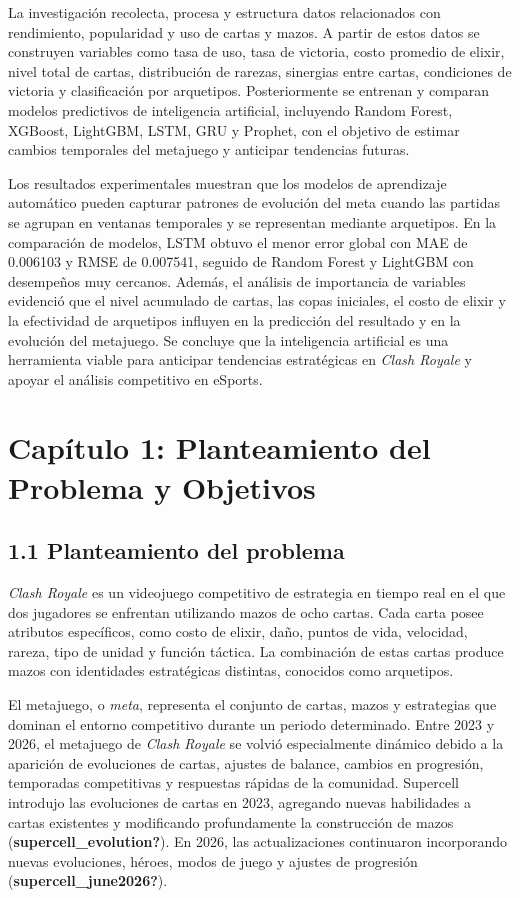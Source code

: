\documentclass[
  spanish,
  12pt,
]{report}
\begin{document}
La investigación recolecta, procesa y estructura datos relacionados con
rendimiento, popularidad y uso de cartas y mazos. A partir de estos
datos se construyen variables como tasa de uso, tasa de victoria, costo
promedio de elixir, nivel total de cartas, distribución de rarezas,
sinergias entre cartas, condiciones de victoria y clasificación por
arquetipos. Posteriormente se entrenan y comparan modelos predictivos de
inteligencia artificial, incluyendo Random Forest, XGBoost, LightGBM,
LSTM, GRU y Prophet, con el objetivo de estimar cambios temporales del
metajuego y anticipar tendencias futuras.

Los resultados experimentales muestran que los modelos de aprendizaje
automático pueden capturar patrones de evolución del meta cuando las
partidas se agrupan en ventanas temporales y se representan mediante
arquetipos. En la comparación de modelos, LSTM obtuvo el menor error
global con MAE de 0.006103 y RMSE de 0.007541, seguido de Random Forest
y LightGBM con desempeños muy cercanos. Además, el análisis de
importancia de variables evidenció que el nivel acumulado de cartas, las
copas iniciales, el costo de elixir y la efectividad de arquetipos
influyen en la predicción del resultado y en la evolución del metajuego.
Se concluye que la inteligencia artificial es una herramienta viable
para anticipar tendencias estratégicas en \emph{Clash Royale} y apoyar
el análisis competitivo en eSports.

\newpage

\chapter{Capítulo 1: Planteamiento del Problema y
Objetivos}\label{capuxedtulo-1-planteamiento-del-problema-y-objetivos}

\section{1.1 Planteamiento del
problema}\label{planteamiento-del-problema}

\emph{Clash Royale} es un videojuego competitivo de estrategia en tiempo
real en el que dos jugadores se enfrentan utilizando mazos de ocho
cartas. Cada carta posee atributos específicos, como costo de elixir,
daño, puntos de vida, velocidad, rareza, tipo de unidad y función
táctica. La combinación de estas cartas produce mazos con identidades
estratégicas distintas, conocidos como arquetipos.

El metajuego, o \emph{meta}, representa el conjunto de cartas, mazos y
estrategias que dominan el entorno competitivo durante un periodo
determinado. Entre 2023 y 2026, el metajuego de \emph{Clash Royale} se
volvió especialmente dinámico debido a la aparición de evoluciones de
cartas, ajustes de balance, cambios en progresión, temporadas
competitivas y respuestas rápidas de la comunidad. Supercell introdujo
las evoluciones de cartas en 2023, agregando nuevas habilidades a cartas
existentes y modificando profundamente la construcción de mazos
(\textbf{supercell\_evolution?}). En 2026, las actualizaciones
continuaron incorporando nuevas evoluciones, héroes, modos de juego y
ajustes de progresión (\textbf{supercell\_june2026?}).
\end{document}
